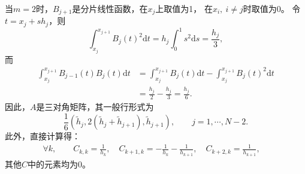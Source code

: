   当$m=2$时，$B_{j+1}$是分片线性函数，在$x_{j}$上取值为1，
  在$x_{i},\ i\neq j$时取值为0。
  令$t=x_{j}+sh_{j}$，则
  \begin{displaymath}
    \int_{x_{j}}^{x_{j+1}}B_{j}(t)^{2}\mathrm{d}t
    =h_{j}\int_{0}^{1}s^{2}\mathrm{d}s=\frac{h_{j}}{3},
  \end{displaymath}
  而
  \begin{displaymath}
    \begin{aligned}
      \int_{x_{j}}^{x_{j+1}}B_{j-1}(t)B_{j}(t)\mathrm{d}t
      &=\int_{x_{j}}^{x_{j+1}}B_{j}(t)\mathrm{d}t
      -\int_{x_{j}}^{x_{j+1}}B_{j}(t)^{2}\mathrm{d}t\\
      &=\frac{h_{j}}{2}-\frac{h_{j}}{3}
      =\frac{h_{j}}{6}.
    \end{aligned} 
  \end{displaymath}
  因此，$A$是三对角矩阵，其一般行形式为
  \begin{displaymath}
    \frac{1}{6}
    \left(\tilde{h}_{j},
      2\left(\tilde{h}_{j}+\tilde{h}_{j+1}\right),\tilde{h}_{j+1}
    \right),
  \qquad j=1,\cdots, N-2.
  \end{displaymath}
  此外，直接计算得：
  \begin{align*}
    \forall k,\qquad
    C_{k,k}=\frac{1}{h_{k}},\quad
    C_{k+1,k}=-\frac{1}{h_{k}}-\frac{1}{h_{k+1}},\quad
    C_{k+2,k}=\frac{1}{h_{k+1}},\quad
  \end{align*}
  其他$C$中的元素均为$0$。

